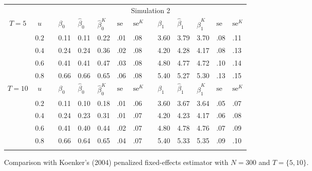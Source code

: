 \documentclass[12pt]{article}
\begin{document}
\begin{table}
\begin{tabular}{cc
m{0.01cm}m{0.5cm}m{0.5cm}m{0.5cm}m{0.3cm}m{0.3cm}
m{0.01cm}m{0.5cm}m{0.5cm}m{0.5cm}m{0.3cm}m{0.3cm}
}
\noalign{\vspace{0.2cm}}
\hline
\hline
\noalign{\vspace{0.2cm}}
 &&& \multicolumn{11}{c}{Simulation 2}\\
\noalign{\vspace{0.1cm}}
\hline
\noalign{\vspace{0.2cm}}
$T = 5$ & $u$ && 
	$\beta_0$ & $\hat\beta_0$ & $\hat\beta_0^K$ & $\text{se}$ & $\text{se}^K$ &&
	$\beta_1$ & $\hat\beta_1$ & $\hat\beta_1^K$ & $\text{se}$ & $\text{se}^K$\\
\cline{4-8}\cline{10-14}
\noalign{\vspace{0.1cm}}
& $0.2$ && 0.11 & 0.11 & 0.22 & .01 & .08 && 3.60 & 3.79 & 3.70 & .08 & .11 \\
& $0.4$ && 0.24 & 0.24 & 0.36 & .02 & .08 && 4.20 & 4.28 & 4.17 & .08 & .13 \\
& $0.6$ && 0.41 & 0.41 & 0.47 & .03 & .08 && 4.80 & 4.77 & 4.72 & .10 & .14 \\
& $0.8$ && 0.66 & 0.66 & 0.65 & .06 & .08 && 5.40 & 5.27 & 5.30 & .13 & .15 \\
\noalign{\vspace{0.2cm}}
$T = 10$ & $u$ && 
	$\beta_0$ & $\hat\beta_0$ & $\hat\beta_0^K$ & $\text{se}$ & $\text{se}^K$ &&
	$\beta_1$ & $\hat\beta_1$ & $\hat\beta_1^K$ & $\text{se}$ & $\text{se}^K$\\
\cline{4-8}\cline{10-14}
\noalign{\vspace{0.1cm}}
& $0.2$ && 0.11 & 0.10 & 0.18 & .01 & .06 && 3.60 & 3.67 & 3.64 & .05 & .07 \\
& $0.4$ && 0.24 & 0.23 & 0.31 & .01 & .07 && 4.20 & 4.23 & 4.17 & .06 & .08 \\
& $0.6$ && 0.41 & 0.40 & 0.44 & .02 & .07 && 4.80 & 4.78 & 4.76 & .07 & .09 \\
& $0.8$ && 0.66 & 0.64 & 0.65 & .04 & .07 && 5.40 & 5.33 & 5.35 & .09 & .10 \\
\noalign{\vspace{0.1cm}}
\hline
\hline
\noalign{\vspace{0.1cm}}
\end{tabular}
\vspace{0.1cm}\footnotesize\center
Comparison with Koenker's (2004) penalized fixed-effects estimator with $N = 300$ and $T = \{5, 10\}$.
\end{table}

\end{document}

